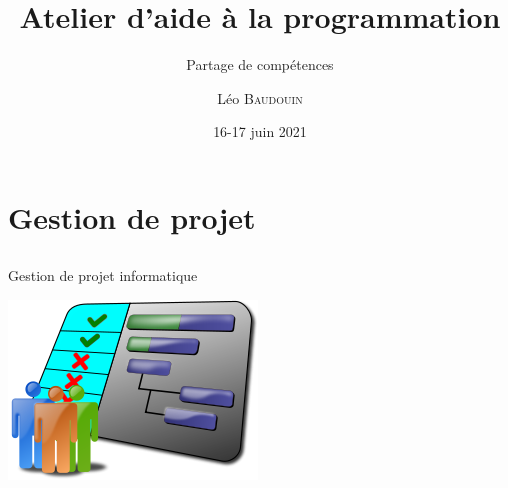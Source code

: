 \documentclass{beamer}
\title{Atelier d'aide à la programmation}
\subtitle{Partage de compétences}
\author{L\'eo \textsc{Baudouin}}
\institute{
  {\url{baudouin.leo @ gmail.com}}
}
\date{16-17 juin 2021}
\begin{document}
\begin{frame}
  \titlepage
\end{frame}




\section{Gestion de projet}
\subsection{}

\begin{frame}{Gestion de projet informatique}
\begin{center}
\includegraphics[width=0.5\linewidth]{images/project}

\end{center}
\end{frame}
\end{document}
